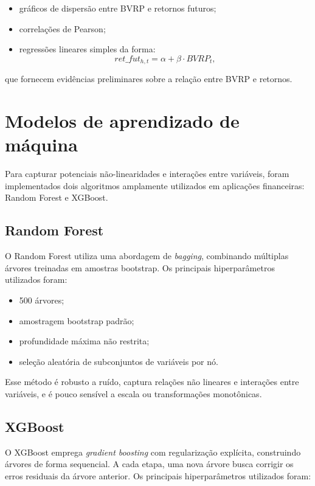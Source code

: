 \begin{itemize}
    \item gráficos de dispersão entre BVRP e retornos futuros;
    \item correlações de Pearson;
    \item regressões lineares simples da forma:
\[
ret\_fut_{h,t} = \alpha + \beta \cdot BVRP_t,
\]
\end{itemize}

que fornecem evidências preliminares sobre a relação entre BVRP e retornos.

\section{Modelos de aprendizado de máquina}

Para capturar potenciais não-linearidades e interações entre variáveis, foram
implementados dois algoritmos amplamente utilizados em aplicações financeiras:
Random Forest e XGBoost.

\subsection{Random Forest}

O Random Forest \citep{breiman2001randomforest} utiliza uma abordagem de
\textit{bagging}, combinando múltiplas árvores treinadas em amostras bootstrap.
Os principais hiperparâmetros utilizados foram:

\begin{itemize}
    \item 500 árvores;
    \item amostragem bootstrap padrão;
    \item profundidade máxima não restrita;
    \item seleção aleatória de subconjuntos de variáveis por nó.
\end{itemize}

Esse método é robusto a ruído, captura relações não lineares e interações entre
variáveis, e é pouco sensível a escala ou transformações monotônicas.

\subsection{XGBoost}

O XGBoost \citep{chen2016xgboost} emprega \textit{gradient boosting} com
regularização explícita, construindo árvores de forma sequencial. A cada etapa,
uma nova árvore busca corrigir os erros residuais da árvore anterior. Os
principais hiperparâmetros utilizados foram:

